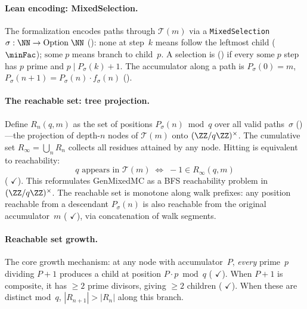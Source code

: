 \paragraph{Lean encoding: MixedSelection.}
The formalization encodes paths through $\mathcal{T}(m)$ via a
\texttt{MixedSelection}
$\sigma : \NN \to \mathrm{Option}\;\NN$
():
$\mathrm{none}$ at step~$k$ means follow the leftmost child
($\minFac$); $\mathrm{some}\;p$ means branch to child~$p$.
A selection is 
()
if every $\mathrm{some}\;p$ step has $p$ prime and $p \mid P_\sigma(k){+}1$.
The accumulator along a path is
$P_\sigma(0) = m$,
$P_\sigma(n{+}1) = P_\sigma(n) \cdot f_\sigma(n)$
().

\paragraph{The reachable set: tree projection.}
Define $R_n(q, m)$ as the set of positions
$P_\sigma(n) \bmod q$ over all valid paths~$\sigma$
()---the
projection of depth-$n$ nodes of $\mathcal{T}(m)$ onto
$(\ZZ/q\ZZ)^\times$.  The cumulative set
$R_\infty = \bigcup_n R_n$ collects all residues attained by
any node.  Hitting is equivalent to reachability:
\[
  q \text{ appears in } \mathcal{T}(m)
  \;\Longleftrightarrow\;
  {-}1 \in R_\infty(q, m)
\]
(
{\color{leanink}$\checkmark$}).
This reformulates GenMixedMC as a BFS reachability problem
in $(\ZZ/q\ZZ)^\times$.
The reachable set is monotone along walk prefixes:
any position reachable from a descendant $P_\sigma(n)$ is also
reachable from the original accumulator~$m$
(
{\color{leanink}$\checkmark$}),
via concatenation of walk segments.

\paragraph{Reachable set growth.}
The core growth mechanism: at any node with accumulator~$P$,
\emph{every} prime~$p$ dividing $P{+}1$ produces a child at position
$P \cdot p \bmod q$
(
{\color{leanink}$\checkmark$}).
When $P{+}1$ is composite, it has $\geq 2$ prime divisors,
giving $\geq 2$ children
(
{\color{leanink}$\checkmark$}).
When these are distinct mod~$q$, $|R_{n+1}| > |R_n|$ along this branch.

